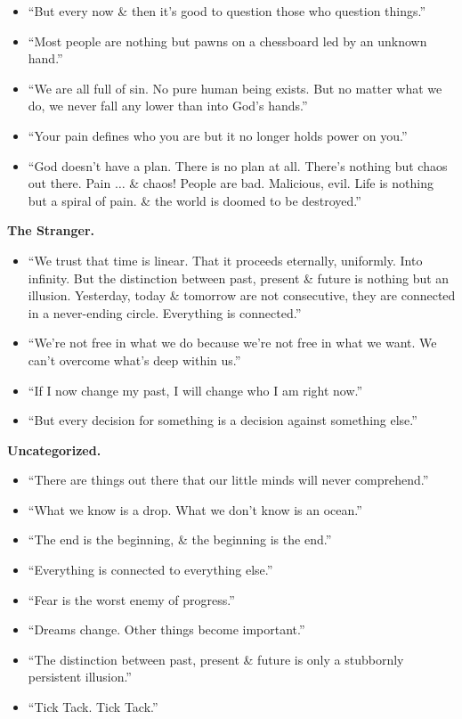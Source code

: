 \documentclass{article}
\begin{document}
\begin{enumerate}
\begin{itemize}
		\item ``But every now \& then it's good to question those who question things.''
		\item ``Most people are nothing but pawns on a chessboard led by an unknown hand.''
		\item ``We are all full of sin. No pure human being exists. But no matter what we do, we never fall any lower than into God's hands.''
		\item ``Your pain defines who you are but it no longer holds power on you.''
		\item ``God doesn't have a plan. There is no plan at all. There's nothing but chaos out there. Pain $\ldots$ \& chaos! People are bad. Malicious, evil. Life is nothing but a spiral of pain. \& the world is doomed to be destroyed.''
	\end{itemize}
	\textbf{The Stranger.}
	\begin{itemize}
		\item ``We trust that time is linear. That it proceeds eternally, uniformly. Into infinity. But the distinction between past, present \& future is nothing but an illusion. Yesterday, today \& tomorrow are not consecutive, they are connected in a never-ending circle. Everything is connected.''
		\item ``We're not free in what we do because we're not free in what we want. We can't overcome what's deep within us.''
		\item ``If I now change my past, I will change who I am right now.''
		\item ``But every decision for something is a decision against something else.''
	\end{itemize}
	\textbf{Uncategorized.}
	\begin{itemize}
		\item ``There are things out there that our little minds will never comprehend.''
		\item ``What we know is a drop. What we don't know is an ocean.''
		\item ``The end is the beginning, \& the beginning is the end.''
		\item ``Everything is connected to everything else.''
		\item ``Fear is the worst enemy of progress.''
		\item ``Dreams change. Other things become important.''
		\item ``The distinction between past, present \& future is only a stubbornly persistent illusion.''
		\item ``Tick Tack. Tick Tack.''

\end{itemize}
\end{enumerate}
\end{document}
